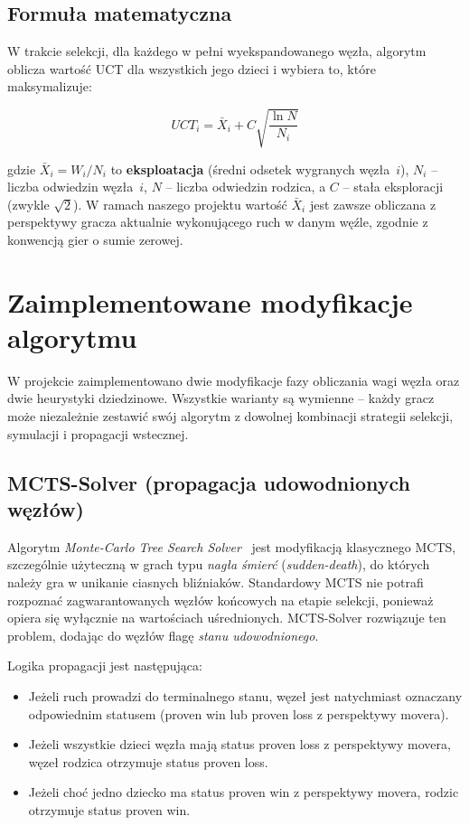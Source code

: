 \documentclass{article}
\begin{document}
\subsection{Formuła matematyczna}
W trakcie selekcji, dla każdego w pełni wyekspandowanego węzła, algorytm
oblicza wartość UCT dla wszystkich jego dzieci i wybiera to, które
maksymalizuje:

\begin{equation}
UCT_i = \bar{X}_i + C \sqrt{\frac{\ln N}{N_i}}
\end{equation}

gdzie $\bar{X}_i = W_i/N_i$ to \textbf{eksploatacja} (średni odsetek
wygranych węzła~$i$), $N_i$ -- liczba odwiedzin węzła~$i$, $N$ -- liczba
odwiedzin rodzica, a $C$ -- stała eksploracji (zwykle $\sqrt{2}$).
W ramach naszego projektu wartość $\bar{X}_i$ jest zawsze obliczana
z perspektywy gracza aktualnie wykonującego ruch w danym węźle, zgodnie
z konwencją gier o sumie zerowej.

\section{Zaimplementowane modyfikacje algorytmu}

W projekcie zaimplementowano dwie modyfikacje fazy obliczania wagi węzła
oraz dwie heurystyki dziedzinowe. Wszystkie warianty są wymienne -- każdy
gracz może niezależnie zestawić swój algorytm z dowolnej kombinacji
strategii selekcji, symulacji i propagacji wstecznej.

\subsection{MCTS-Solver (propagacja udowodnionych węzłów)}
Algorytm \emph{Monte-Carlo Tree Search Solver}~\cite{Winands2008} jest
modyfikacją klasycznego MCTS, szczególnie użyteczną w grach typu
\emph{nagła śmierć} (\textit{sudden-death}), do których należy gra
w unikanie ciasnych bliźniaków. Standardowy MCTS nie potrafi rozpoznać
zagwarantowanych węzłów końcowych na etapie selekcji, ponieważ opiera
się wyłącznie na wartościach uśrednionych. MCTS-Solver rozwiązuje ten
problem, dodając do węzłów flagę \emph{stanu udowodnionego}.

Logika propagacji jest następująca:
\begin{itemize}
    \item Jeżeli ruch prowadzi do terminalnego stanu, węzeł jest natychmiast
    oznaczany odpowiednim statusem (proven win lub proven loss z perspektywy
    movera).
    \item Jeżeli wszystkie dzieci węzła mają status proven loss z perspektywy
    movera, węzeł rodzica otrzymuje status proven loss.
    \item Jeżeli choć jedno dziecko ma status proven win z perspektywy
    movera, rodzic otrzymuje status proven win.
\end{itemize}
\end{document}
